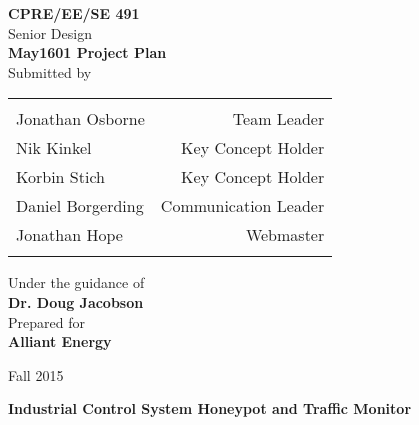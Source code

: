 \begin{titlepage}

\begin{center}

\textup{\small {\bf CPRE/EE/SE 491} \\ Senior Design}\\[0.2in]

\Large \textbf {May1601 Project Plan}\\[0.5in]

\normalsize Submitted by \\
\begin{table}[h]
\centering
\begin{tabular}{lr}\hline \\
Jonathan Osborne & Team Leader \\
Nik Kinkel & Key Concept Holder \\ 
Korbin Stich & Key Concept Holder \\ 
Daniel Borgerding & Communication Leader \\ 
Jonathan Hope & Webmaster \\
\\ \hline

\end{tabular}
\end{table}

\vspace{.3in}
Under the guidance of\\
{\textbf{Dr. Doug Jacobson}}\\[0.3in]

\vspace{.3in}
Prepared for\\
{\textbf{Alliant Energy}}\\[0.3in]

\vfill

\vspace{0.2cm}
Fall 2015

\end{center}
\end{titlepage}

\begin{titlepage}
\begin{center}

\vspace*{\fill}
\Huge \textbf {Industrial Control System Honeypot and Traffic Monitor}\\[0.5in]
\vspace*{\fill}

\end{center}
\end{titlepage}
